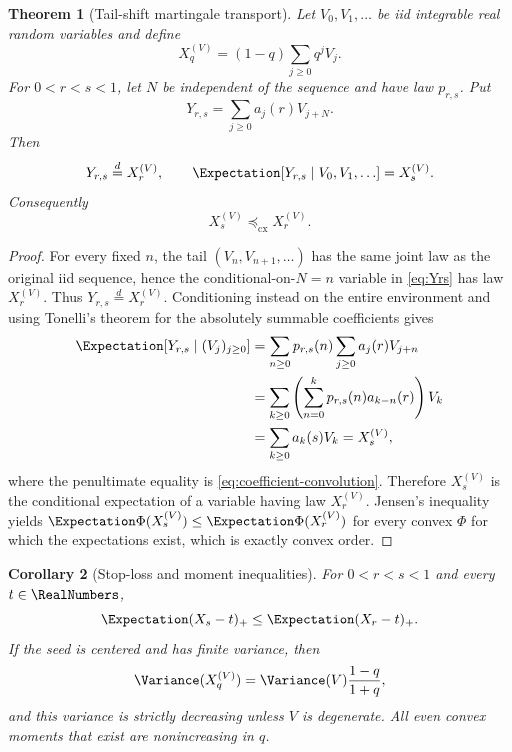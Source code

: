 \documentclass[11pt,a4paper]{article}
\newtheorem{theorem}{Theorem}[section]
\newtheorem{corollary}[theorem]{Corollary}
\theoremstyle{definition}
\begin{document}
\begin{theorem}[Tail-shift martingale transport]
\label{thm:martingale-transport}
Let $V_0,V_1,\ldots$ be iid integrable real random variables and define
\begin{equation}
 X_q^{(V)}=(1-q)\sum_{j\ge0}q^jV_j.
 \label{eq:general-seed}
\end{equation}
For $0<r<s<1$, let $N$ be independent of the sequence and have law
$p_{r,s}$.  Put
\begin{equation}
 Y_{r,s}=\sum_{j\ge0}a_j(r)V_{j+N}.
 \label{eq:Yrs}
\end{equation}
Then
\begin{equation}
 Y_{r,s}\overset d=X_r^{(V)},
 \qquad
 \Expectation\!\left[Y_{r,s}\mid V_0,V_1,\ldots\right]=X_s^{(V)}.
 \label{eq:martingale-coupling}
\end{equation}
Consequently
\begin{equation}
 X_s^{(V)}\preceq_{\mathrm{cx}}X_r^{(V)}.
 \label{eq:convex-order}
\end{equation}
\end{theorem}

\begin{proof}
For every fixed $n$, the tail $(V_n,V_{n+1},\ldots)$ has the same joint law
as the original iid sequence, hence the conditional-on-$N=n$ variable in
\eqref{eq:Yrs} has law $X_r^{(V)}$.  Thus $Y_{r,s}\overset d=X_r^{(V)}$.
Conditioning instead on the entire environment and using Tonelli's theorem
for the absolutely summable coefficients gives
\begin{align*}
 \Expectation[Y_{r,s}\mid(V_j)_{j\ge0}]
 &=\sum_{n\ge0}p_{r,s}(n)\sum_{j\ge0}a_j(r)V_{j+n}\\
 &=\sum_{k\ge0}\left(\sum_{n=0}^{k}p_{r,s}(n)a_{k-n}(r)\right)V_k\\
 &=\sum_{k\ge0}a_k(s)V_k
 =X_s^{(V)},
\end{align*}
where the penultimate equality is \eqref{eq:coefficient-convolution}.
Therefore $X_s^{(V)}$ is the conditional expectation of a variable having
law $X_r^{(V)}$.  Jensen's inequality yields
$\Expectation\Phi(X_s^{(V)})\le\Expectation\Phi(X_r^{(V)})$ for every convex $\Phi$ for which
the expectations exist, which is exactly convex order.
\end{proof}

\begin{corollary}[Stop-loss and moment inequalities]
\label{cor:stoploss}
For $0<r<s<1$ and every $t\in\RealNumbers$,
\begin{equation}
 \Expectation(X_s-t)_+\le \Expectation(X_r-t)_+.
 \label{eq:stoploss}
\end{equation}
If the seed is centered and has finite variance, then
\begin{equation}
 \Variance(X_q^{(V)})=\Variance(V)\frac{1-q}{1+q},
 \label{eq:general-variance}
\end{equation}
and this variance is strictly decreasing unless $V$ is degenerate.  All
even convex moments that exist are nonincreasing in $q$.
\end{corollary}
\end{document}
